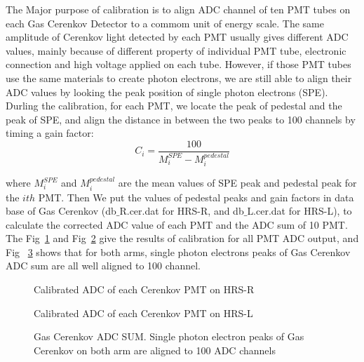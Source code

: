  The Major purpose of calibration is to align ADC channel of ten PMT tubes on each Gas Cerenkov Detector to a commom unit of energy scale. The same amplitude of Cerenkov light detected by each PMT usually gives different ADC values, mainly because of different property of individual PMT tube, electronic connection and high voltage applied on each tube. However, if those PMT tubes use the same materials to create photon electrons, we are still able to align their ADC values by looking the peak position of single photon electrons (SPE). Durling the calibration, for each PMT, we locate the peak of pedestal and the peak of SPE, and align the distance in between the two peaks to 100 channels by timing a gain factor:
\begin{equation}
 C_{i} = \frac{100}{M_{i}^{SPE}-M_{i}^{pedestal}}
\end{equation}

 where $M_{i}^{SPE}$ and $M_{i}^{pedestal}$ are the mean values of SPE peak and pedestal peak for the $ith$ PMT. Then We put the values of pedestal peaks and gain factors in data base of Gas Cerenkov (db$\_$R.cer.dat for HRS-R, and db$\_$L.cer.dat for HRS-L), to calculate the corrected ADC value of each PMT and the ADC sum of 10 PMT. The Fig~\ref{gcr_ac} and Fig~\ref{gcl_ac} give the results of calibration for all PMT ADC output, and Fig ~\ref{gc_spe} shows that for both arms, single photon electrons peaks of Gas Cerenkov ADC sum are all well aligned to 100 channel.

\begin{figure}[htb]
\centerline{}
\caption[Calibrated ADC of each Cerenkov PMT]{\footnotesize{Calibrated ADC of each Cerenkov PMT on HRS-R}
\label{gcr_ac}}
\end{figure}

\begin{figure}[htb]
\centerline{}
\caption[Calibrated ADC of each Cerenkov PMT]{\footnotesize{Calibrated ADC of each Cerenkov PMT on HRS-L}
\label{gcl_ac}}
\end{figure}

\begin{figure}[htb]
\centerline{}
\caption[Gas Cerenkov ADC SUM. Single photon electron peaks of Gas Cerenkov on both arm are aligned to 100 ADC channels]{\footnotesize{Gas Cerenkov ADC SUM. Single photon electron peaks of Gas Cerenkov on both arm are aligned to 100 ADC channels}
\label{gc_spe}}
\end{figure}

